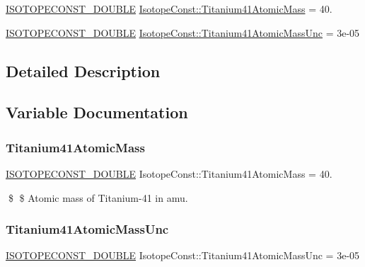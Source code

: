 \begin{DoxyCompactItemize}
\item 
\mbox{\hyperlink{group___isotope_const-_macros_ga8f45a7272ce02c0b4c65c44636ed719a}{I\+S\+O\+T\+O\+P\+E\+C\+O\+N\+S\+T\+\_\+\+D\+O\+U\+B\+LE}} \mbox{\hyperlink{group___isotope_const-_titanium-_ti41_ga2027b84b98a2f55ac7ab7467aaad7525}{Isotope\+Const\+::\+Titanium41\+Atomic\+Mass}} = 40.
\item 
\mbox{\hyperlink{group___isotope_const-_macros_ga8f45a7272ce02c0b4c65c44636ed719a}{I\+S\+O\+T\+O\+P\+E\+C\+O\+N\+S\+T\+\_\+\+D\+O\+U\+B\+LE}} \mbox{\hyperlink{group___isotope_const-_titanium-_ti41_ga496adb2ce967bdf29ef85861b0c35b70}{Isotope\+Const\+::\+Titanium41\+Atomic\+Mass\+Unc}} = 3e-\/05
\end{DoxyCompactItemize}


\subsection{Detailed Description}


\subsection{Variable Documentation}
\mbox{\label{group___isotope_const-_titanium-_ti41_ga2027b84b98a2f55ac7ab7467aaad7525}} 
\subsubsection{\texorpdfstring{Titanium41\+Atomic\+Mass}{Titanium41AtomicMass}}
{\footnotesize\ttfamily \mbox{\hyperlink{group___isotope_const-_macros_ga8f45a7272ce02c0b4c65c44636ed719a}{I\+S\+O\+T\+O\+P\+E\+C\+O\+N\+S\+T\+\_\+\+D\+O\+U\+B\+LE}} Isotope\+Const\+::\+Titanium41\+Atomic\+Mass = 40.}

\$ \$ Atomic mass of Titanium-\/41 in amu. \mbox{\label{group___isotope_const-_titanium-_ti41_ga496adb2ce967bdf29ef85861b0c35b70}} 
\subsubsection{\texorpdfstring{Titanium41\+Atomic\+Mass\+Unc}{Titanium41AtomicMassUnc}}
{\footnotesize\ttfamily \mbox{\hyperlink{group___isotope_const-_macros_ga8f45a7272ce02c0b4c65c44636ed719a}{I\+S\+O\+T\+O\+P\+E\+C\+O\+N\+S\+T\+\_\+\+D\+O\+U\+B\+LE}} Isotope\+Const\+::\+Titanium41\+Atomic\+Mass\+Unc = 3e-\/05}

